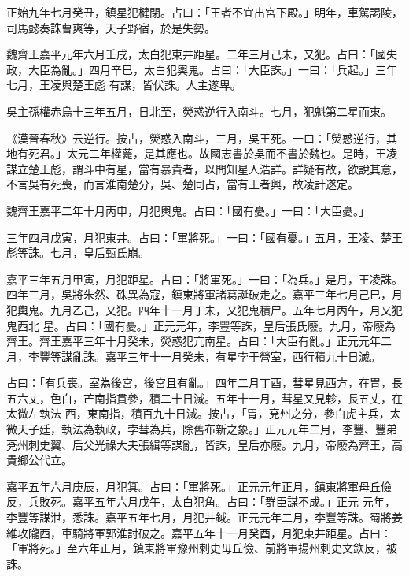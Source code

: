 \begin{pinyinscope}
 正始九年七月癸丑，鎮星犯楗閉。占曰：「王者不宜出宮下殿。」明年，車駕謁陵，司馬懿奏誅曹爽等，天子野宿，於是失勢。



 魏齊王嘉平元年六月壬戌，太白犯東井距星。二年三月己未，又犯。占曰：「國失政，大臣為亂。」四月辛巳，太白犯輿鬼。占曰：「大臣誅。」一曰：「兵起。」三年七月，王凌與楚王彪
 有謀，皆伏誅。人主遂卑。



 吳主孫權赤烏十三年五月，日北至，熒惑逆行入南斗。七月，犯魁第二星而東。



 《漢晉春秋》云逆行。按占，熒惑入南斗，三月，吳王死。一曰：「熒惑逆行，其地有死君。」太元二年權薨，是其應也。故國志書於吳而不書於魏也。是時，王凌謀立楚王彪，謂斗中有星，當有暴貴者，以問知星人浩詳。詳疑有故，欲說其意，不言吳有死喪，而言淮南楚分，吳、楚同占，當有王者興，故凌計遂定。



 魏齊王嘉平二年十月丙申，月犯輿鬼。占曰：「國有憂。」一曰：「大臣憂。」



 三年四月戊寅，月犯東井。占曰：「軍將死。」一曰：「國有憂。」五月，王凌、楚王彪等誅。七月，皇后甄氏崩。



 嘉平三年五月甲寅，月犯距星。占曰：「將軍死。」一曰：「為兵。」是月，王凌誅。四年三月，吳將朱然、硃異為寇，鎮東將軍諸葛誕破走之。嘉平三年七月己巳，月犯輿鬼。九月乙己，又犯。四年十一月丁未，又犯鬼積尸。五年七月丙午，月又犯鬼西北
 星。占曰：「國有憂。」正元元年，李豐等誅，皇后張氏廢。九月，帝廢為齊王。齊王嘉平三年十月癸未，熒惑犯亢南星。占曰：「大臣有亂。」正元元年二月，李豐等謀亂誅。嘉平三年十一月癸未，有星孛于營室，西行積九十日滅。



 占曰：「有兵喪。室為後宮，後宮且有亂。」四年二月丁酉，彗星見西方，在胃，長五六丈，色白，芒南指貫參，積二十日滅。五年十一月，彗星又見軫，長五丈，在太微左執法
 西，東南指，積百九十日滅。按占，「胃，兗州之分，參白虎主兵，太微天子廷，執法為執政，孛彗為兵，除舊布新之象。」正元元年二月，李豐、豐弟兗州刺史翼、后父光祿大夫張緝等謀亂，皆誅，皇后亦廢。九月，帝廢為齊王，高貴鄉公代立。



 嘉平五年六月庚辰，月犯箕。占曰：「軍將死。」正元元年正月，鎮東將軍母丘儉反，兵敗死。嘉平五年六月戊午，太白犯角。占曰：「群臣謀不成。」正元
 元年，李豐等謀泄，悉誅。嘉平五年七月，月犯井鉞。正元元年二月，李豐等誅。蜀將姜維攻隴西，車騎將軍郭淮討破之。嘉平五年十一月癸酉，月犯東井距星。占曰：「軍將死。」至六年正月，鎮東將軍豫州刺史毋丘儉、前將軍揚州刺史文欽反，被誅。




\end{pinyinscope}
